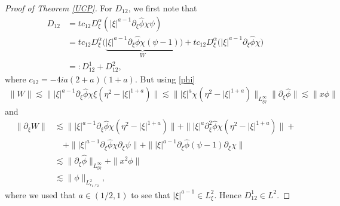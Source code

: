 \documentclass[reqno]{amsart}
\newcommand{\ha}{\hat{\phi}}
\newcommand{\les}{\lesssim}
\newcommand{\La}{\|\phi\|_{L^2_{r_1,r_2}}}
\newcommand{\dt}{D^{\alpha}_\xi}
\newcommand{\p}{\partial}
\numberwithin{equation}{section}
\begin{document}
\begin{proof}[Proof of Theorem \ref{UCP}]
For $D_{12}$, we first note that
\begin{equation}
\begin{split}\label{d14}
D_{12}&=tc_{12} \dt(|\xi|^{a-1}\p_\xi\ha \chi \psi)\\
&= tc_{12} \dt  \big(\underbrace{|\xi|^{a-1} \p_\xi \ha\chi(\psi-1)}_{W}\big)+tc_{12}\dt \big(|\xi|^{a-1}\p_\xi \ha \chi\big)\\
&=:D_{12}^1+D_{12}^2,
\end{split}
\end{equation}
where $c_{12}=-4ia(2+a)(1+a)$. But using \eqref{phi}
\begin{equation*}
\begin{split}
\|W\|\lesssim\||\xi|^{a-1} \p_\xi \ha\chi\xi(\eta^2-|\xi|^{1+a})\|
\lesssim\||\xi|^{a} \chi (\eta^2-|\xi|^{1+a})\|_{L^\infty_{\xi\eta}}\|\p_\xi \ha\|
\lesssim \|x \phi\|
\end{split}
\end{equation*}
and
\begin{equation*}
\begin{split}
\|\p_\xi W\|&\lesssim\||\xi|^{a-1}\p_\xi \ha\chi(\eta^2-|\xi|^{1+a})\|+\||\xi|^{a}\p_\xi^2 \ha\chi (\eta^2-|\xi|^{1+a})\|+\\
&\quad+\||\xi|^{a-1}\p_\xi \ha \chi\p_\xi\psi\|+\||\xi|^{a-1}\p_\xi\ha(\psi-1)\p_\xi \chi\|\\
&\lesssim \|\p_\xi \ha\|_{L^\infty_{\xi\eta}}+\|x^2\phi\|\\
&\les\La,
\end{split}
\end{equation*}
where we used that $a\in (1/2,1)$ to see that $|\xi|^{a-1}\in L^2_\xi$. Hence $D_{12}^1\in L^2$. 


\end{proof}
\end{document}
